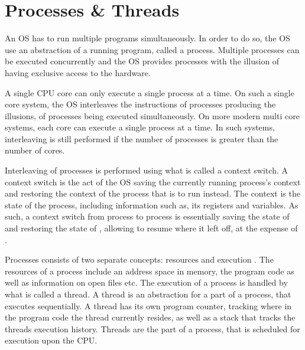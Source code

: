 \section{Processes \& Threads}\label{sec:processes_threads}
An \ac{OS} has to run multiple programs simultaneously. In order to do so, the \ac{OS} use an abstraction of a running program, called a process\cite[p. 81]{tanenbaum2008modern}\cite[p. 16]{bryant2011computer}. Multiple processes can be executed concurrently and the \ac{OS} provides processes with the illusion of having exclusive access to the hardware\cite[p. 16]{bryant2011computer}. 

A single \ac{CPU} core can only execute a single process at a time. On such a single core system, the \ac{OS} interleaves the instructions of processes producing the illusions, of processes being executed simultaneously\cite[p. 16]{bryant2011computer}. On more modern multi core systems, each core can execute a single process at a time. In such systems, interleaving is still performed if the number of processes is greater than the number of cores.

Interleaving of processes is performed using what is called a context switch\cite[p. 16]{bryant2011computer}. A context switch is the act of the \ac{OS} saving the currently running process's context and restoring the context of the process that is to run instead. The context is the state of the process, including information such as, its registers and variables\cite[p. 82]{tanenbaum2008modern}. As such, a context switch from process  to process  is essentially saving the state of  and restoring the state of , allowing  to resume where it left off, at the expense of .

Processes consists of two separate concepts: resources and execution \cite[p. 98]{tanenbaum2008modern}. The resources of a process include an address space in memory, the program code as well as information on open files etc. The execution of a process is handled by what is called a thread\cite[p. 98]{tanenbaum2008modern}. A thread is an abstraction for a part of a process, that executes sequentially. A thread has its own program counter, tracking where in the program code the thread currently resides, as well as a stack that tracks the threads execution history\cite[p. 99]{tanenbaum2008modern}. Threads are the part of a process, that is scheduled for execution upon the \ac{CPU}.

